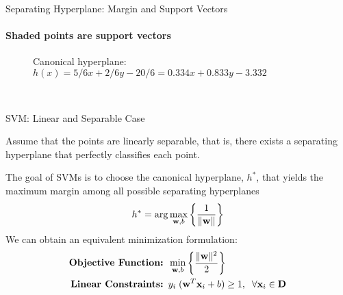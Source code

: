 \begin{frame}{Separating Hyperplane: Margin and Support Vectors}
  \framesubtitle{Shaded points are support vectors}
\begin{figure}[!t]
  \centerline{Canonical hyperplane: $h(x) = 5/6x + 2/6y - 20/6 
  = 0.334x + 0.833y - 3.332$}
  \centerline{~}
\end{figure}
\end{frame}



\begin{frame}{SVM: Linear and Separable Case}

Assume that the points are linearly separable, that is, there exists a separating hyperplane that perfectly classif\/{i}es each point. 

\medskip
The goal of SVMs is to choose the canonical
hyperplane, $h^*$,
that yields the maximum margin among all possible separating
hyperplanes
\begin{align*}
    h^* = \arg \max_{\mathbf{w},b} \left\{ {1 \over \| \mathbf{w} \|} \right\}
\end{align*}
We can obtain an equivalent minimization
formulation:
\begin{align*}
    \mbox{\bf Objective Function: } &  \min_{\mathbf{w},b}
    \left\{ \frac{\| \mathbf{w} \|^2}{2} \right\} \\
  \mbox{\bf Linear Constraints: }& y_i \; (\mathbf{w}^T\mathbf{x}_i + b) \ge 1,\;\;
  \forall \mathbf{x}_i \in \mathbf{D}
\end{align*}
\end{frame}


